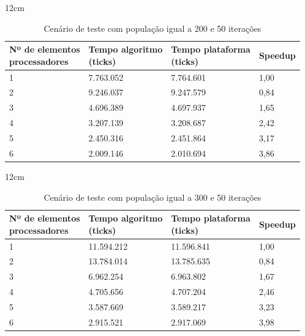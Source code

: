 \begin{table}[h]{12cm}
    \caption{Cenário de teste com população igual a 200 e 50 iterações}
    \label{tbl:taylor-vortex-parameters}
    \begin{tabular}{llll}
        \hline
        \shortstack[l]{Nº de elementos \\ processadores} & \shortstack[l]{Tempo algoritmo \\ (ticks)} & \shortstack[l]{Tempo plataforma \\ (ticks)} & Speedup \\
        \hline
        1 & 7.763.052 & 7.764.601 & 1,00 \\
        2 & 9.246.037 & 9.247.579 & 0,84 \\
        3 & 4.696.389 & 4.697.937 &	1,65 \\
        4 & 3.207.139 & 3.208.687 & 2,42 \\
        5 & 2.450.316 & 2.451.864 & 3,17 \\
        6 & 2.009.146 & 2.010.694 & 3,86 \\
        \hline
    \end{tabular}
\end{table}

\begin{table}[h]{12cm}
    \caption{Cenário de teste com população igual a 300 e 50 iterações}
    \label{tbl:taylor-vortex-parameters}
    \begin{tabular}{llll}
        \hline
        \shortstack[l]{Nº de elementos \\ processadores} & \shortstack[l]{Tempo algoritmo \\ (ticks)} & \shortstack[l]{Tempo plataforma \\ (ticks)} & Speedup \\
        \hline
        1 & 11.594.212 & 11.596.841 & 1,00 \\
        2 & 13.784.014 & 13.785.635 & 0,84 \\
        3 & 6.962.254  & 6.963.802  & 1,67 \\
        4 & 4.705.656  & 4.707.204  & 2,46 \\
        5 & 3.587.669  & 3.589.217  & 3,23 \\
        6 & 2.915.521  & 2.917.069  & 3,98 \\
        \hline
    \end{tabular}
\end{table}

